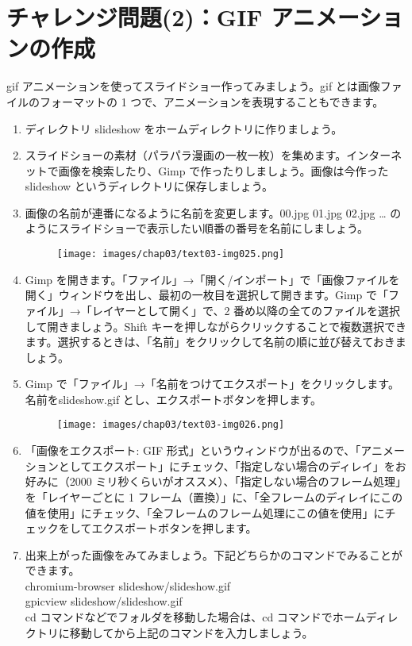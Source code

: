 \section{チャレンジ問題(2)：GIF アニメーションの作成}
\label{GIF}
gif アニメーションを使ってスライドショー作ってみましょう。gif とは画像ファイルのフォーマットの 1 つで、アニメーションを表現することもできます。\\
\begin{enumerate}
\item ディレクトリ slideshow をホームディレクトリに作りましょう。\\
\item スライドショーの素材（パラパラ漫画の一枚一枚）を集めます。インターネットで画像を検索したり、Gimp で作ったりしましょう。画像は今作った slideshow というディレクトリに保存しましょう。\\
\item 画像の名前が連番になるように名前を変更します。00.jpg 01.jpg 02.jpg … のようにスライドショーで表示したい順番の番号を名前にしましょう。\\
\begin{figure}[H]
    \centering
    \texttt{[image: images/chap03/text03-img025.png]}
\end{figure}
\item Gimp を開きます。「ファイル」→「開く/インポート」で「画像ファイルを開く」ウィンドウを出し、最初の一枚目を選択して開きます。Gimp で「ファイル」→「レイヤーとして開く」で、2 番め以降の全てのファイルを選択して開きましょう。Shift キーを押しながらクリックすることで複数選択できます。選択するときは、「名前」をクリックして名前の順に並び替えておきましょう。\\
\item Gimp で「ファイル」→「名前をつけてエクスポート」をクリックします。名前をslideshow.gif とし、エクスポートボタンを押します。
\begin{figure}[H]
    \centering
    \texttt{[image: images/chap03/text03-img026.png]}
\end{figure}
\item 「画像をエクスポート: GIF 形式」というウィンドウが出るので、「アニメーションとしてエクスポート」にチェック、「指定しない場合のディレイ」をお好みに（2000 ミリ秒くらいがオススメ）、「指定しない場合のフレーム処理」を「レイヤーごとに 1 フレーム（置換）」に、「全フレームのディレイにこの値を使用」にチェック、「全フレームのフレーム処理にこの値を使用」にチェックをしてエクスポートボタンを押します。\\
\item 出来上がった画像をみてみましょう。下記どちらかのコマンドでみることができます。\\
chromium-browser slideshow/slideshow.gif\\
gpicview slideshow/slideshow.gif\\
cd コマンドなどでフォルダを移動した場合は、cd コマンドでホームディレクトリに移動してから上記のコマンドを入力しましょう。
\end{enumerate}

\begin{tcolorbox}[title=\useOmetoi]
\begin{enumerate}
\end{enumerate}
\end{tcolorbox}
